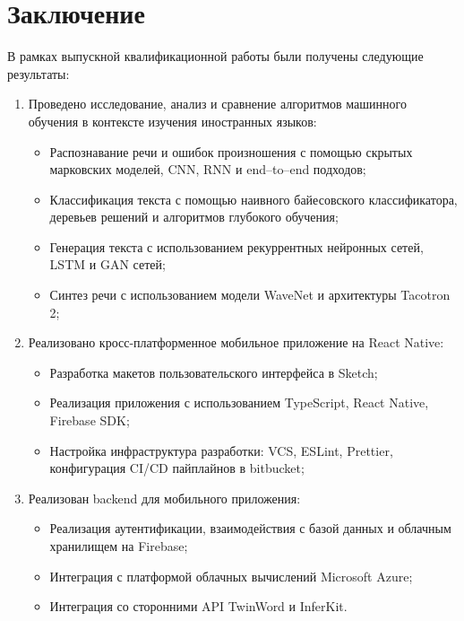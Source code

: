 \section*{Заключение}
В рамках выпускной квалификационной работы были получены следующие результаты:

\begin{enumerate}
	\item  Проведено исследование, анализ и сравнение алгоритмов машинного обучения в контексте изучения иностранных языков:
	\begin{itemize}
		\item Распознавание речи и ошибок произношения с помощью скрытых марковских моделей, CNN, RNN и end--to--end подходов;
		\item Классификация текста с помощью наивного байесовского классификатора, деревьев решений и алгоритмов глубокого обучения;
		\item Генерация текста с использованием рекуррентных нейронных сетей, LSTM и GAN сетей;
		\item Синтез речи с использованием модели WaveNet и архитектуры Tacotron 2;
	\end{itemize}
	\item Реализовано кросс-платформенное мобильное приложение на React Native:
	\begin{itemize}
		\item Разработка макетов пользовательского интерфейса в Sketch;
		\item Реализация приложения с использованием TypeScript, React Native, Firebase SDK;
		\item Настройка инфраструктура разработки: VCS, ESLint, Prettier, конфигурация CI/CD пайплайнов в bitbucket;
	\end{itemize}
	\item Реализован backend для мобильного приложения:
	\begin{itemize}
		\item Реализация аутентификации, взаимодействия с базой данных и облачным хранилищем на Firebase;
		\item Интеграция с платформой облачных вычислений Microsoft Azure;
		\item Интеграция со сторонними API TwinWord и InferKit.
	\end{itemize}
\end{enumerate}

